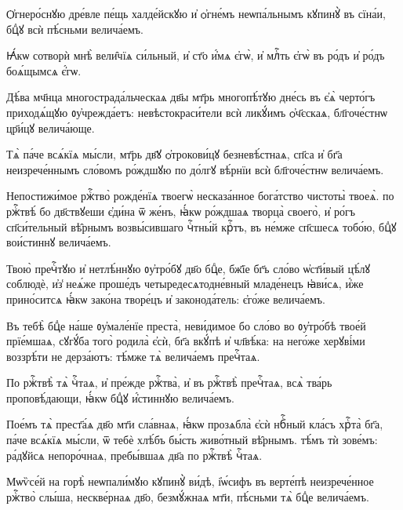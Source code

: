 \hKv Ѻ҆гнеро́снꙋю дре́вле пе́щь халде́йскꙋю и҆ ѻ҆гне́мъ  неѡпа́льнымъ кꙋпинꙋ̀ въ сїна́и, бцⷣꙋ всѝ пѣ́сньми  велича́емъ. 

\hKv Ꙗ҆́кѡ сотворѝ мнѣ̀ вели̑чїѧ си́льный, и҆ ст҃о и҆́мѧ  є҆гѡ̀, и҆ млⷭ҇ть є҆гѡ̀ въ ро́дъ и҆ ро́дъ боѧ́щымсѧ є҆́гѡ. 

\hKv Дѣ́ва мч҃нца многострада́льческаѧ дв҃ы мт҃рь многопѣ́тꙋю  дне́сь въ є҆ѧ̀ черто́гъ приходѧ́щꙋю ᲂу҆чрежда́етъ:  невѣстокраси́тели всѝ ликꙋ́имъ ѻ҆ч҃єскаѧ, бл҃гоче́стнѡ  цр҃и́цꙋ велича́юще. 

\hKv Тѧ̀ па́че всѧ́кїѧ мы́сли, мт҃рь дв҃ꙋ ѻ҆трокови́цꙋ  безневѣ́стнаѧ, сп҃са и҆ бг҃а   неизрече́ннымъ сло́вомъ ро́ждшꙋю по до́лгꙋ вѣ́рнїи всѝ  бл҃гоче́стнѡ велича́емъ.  

\hKv Непостижи́мое ржⷭ҇тво̀ рожде́нїѧ твоегѡ̀ несказа́нное  бога́тство чистоты̀ твоеѧ̀. по ржⷭ҇твѣ́ бо дв҃ствꙋеши  є҆ди́на ѿ же́нъ, ꙗ҆́кѡ ро́ждшаѧ творца̀ своего̀, и҆  ро́гъ сп҃си́тельный вѣ̑рнымъ возвы́сившаго чⷭ҇тны́й крⷭ҇тъ,  въ не́мже сп҃сшесѧ тобо́ю, бцⷣꙋ вои́стиннꙋ велича́емъ. 

\hKv Твою̀ пречⷭ҇тꙋю и҆ нетлѣ́ннꙋю ᲂу҆тро́бꙋ дв҃о бцⷣе, бж҃їе  бг҃ъ сло́во ѡ҆ст҃и́вый цѣ́лꙋ соблюдѐ, и҆з̾ неѧ́же  проше́дъ четыредесѧтодне́вный младе́нецъ ꙗ҆ви́сѧ, и҆́же  прино́ситсѧ ꙗ҆́кѡ зако́на творе́цъ и҆ законода́тель:  є҆го́же велича́емъ. 

\hKv Въ тебѣ̀ бцⷣе на́ше ᲂу҆мале́нїе преста̀, неви́димое бо  сло́во во ᲂу҆тро́бѣ твое́й прїе́мшаѧ, сꙋгꙋ́ба того̀  родила̀ є҆сѝ, бг҃а вкꙋ́пѣ и҆ чл҃вѣ́ка: на него́же  херꙋві́ми воззрѣ́ти не дерза́ютъ: тѣ́мже тѧ̀ велича́емъ  пречⷭ҇таѧ.  

\hKv По ржⷭ҇твѣ̀ тѧ̀ чⷭ҇таѧ, и҆ пре́жде ржⷭ҇тва̀, и҆ въ  ржⷭ҇твѣ̀ пречⷭ҇таѧ, всѧ̀ тва́рь проповѣ́дающи, ꙗ҆́кѡ  бцⷣꙋ и҆́стиннꙋю велича́емъ. 

\hKv Пое́мъ тѧ̀ прест҃а́ѧ дв҃о мт҃и сла́внаѧ, ꙗ҆́кѡ прозѧбла̀  є҆сѝ нбⷭ҇ный кла́съ хрⷭ҇та̀ бг҃а, па́че всѧ́кїѧ мы́сли,  ѿ тебѐ хлѣ́бъ бы́сть живо́тный вѣ̑рнымъ. тѣ́мъ тѝ  зове́мъ: ра́дꙋйсѧ непоро́чнаѧ, пребы́вшаѧ дв҃а по ржⷭ҇твѣ̀  чⷭ҇таѧ. 

\hKv Мѡѷсе́й на горѣ̀ неѡпали́мꙋю кꙋпинꙋ̀ ви́дѣ, і҆ѡ́сифъ въ  верте́пѣ неизрече́нное ржⷭ҇тво̀ слы́ша, нескве́рнаѧ дв҃о,  безмꙋ́жнаѧ мт҃и, пѣ́сньми тѧ̀ бцⷣе велича́емъ.  
